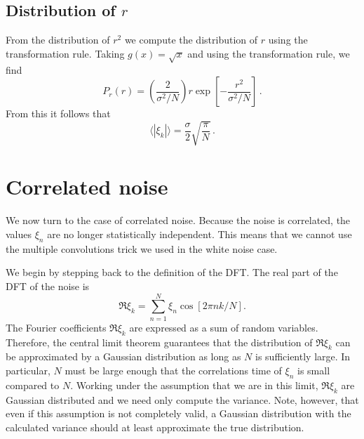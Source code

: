 \subsection{Distribution of $r$}

From the distribution of $r^2$ we compute the distribution of $r$ using the transformation rule.
Taking $g(x) = \sqrt{x}$ and using the transformation rule, we find
\begin{equation}
P_r(r) = \left( \frac{2}{\sigma^2/N} \right) r \exp \left[ - \frac{r^2}{\sigma^2/N} \right] \, .
\end{equation}
From this it follows that
\begin{equation}
\langle \left \lvert \xi_k \right \rvert \rangle = \frac{\sigma}{2} \sqrt{\frac{\pi}{N}} \, .
\end{equation}

\section{Correlated noise}

We now turn to the case of correlated noise.
Because the noise is correlated, the values $\xi_n$ are no longer statistically independent.
This means that we cannot use the multiple convolutions trick we used in the white noise case.

We begin by stepping back to the definition of the DFT.
The real part of the DFT of the noise is \begin{equation}
\Re \xi_k = \sum_{n=1}^{N} \xi_n \cos \left[ 2\pi n k / N \right] . \end{equation}
The Fourier coefficients $\Re \xi_k$ are expressed as a sum of random variables.
Therefore, the central limit theorem guarantees that the distribution of $\Re \xi_k$ can be approximated by a Gaussian distribution as long as $N$ is sufficiently large.
In particular, $N$ must be large enough that the correlations time of $\xi_n$ is small compared to $N$.
Working under the assumption that we are in this limit, $\Re \xi_k$ are Gaussian distributed and we need only compute the variance.
Note, however, that even if this assumption is not completely valid, a Gaussian distribution with the calculated variance should at least approximate the true distribution.

